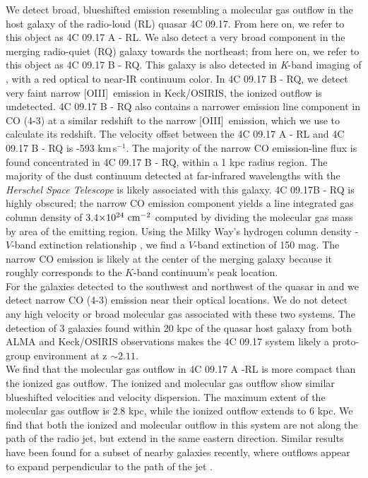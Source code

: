 \documentclass[twocolumn]{aastex63}
\newcommand{\oiii}{[O{\sc III}]\xspace}
\newcommand{\kms}{km\,s$^{-1}$}
\begin{document}
We detect broad, blueshifted emission resembling a molecular gas outflow in the host galaxy of the radio-loud (RL) quasar 4C 09.17. From here on, we refer to this object as 4C 09.17 A - RL. We also detect a very broad component in the merging radio-quiet (RQ) galaxy towards the northeast; from here on, we refer to this object as 4C 09.17 B - RQ. This galaxy is also detected in \textit{K}-band imaging of \citet{Armus97}, with a red optical to near-IR continuum color. In 4C 09.17 B - RQ, we detect very faint narrow \oiii\ emission in Keck/OSIRIS, the ionized outflow is undetected. 4C 09.17 B - RQ also contains a narrower emission line component in CO (4-3) at a similar redshift to the narrow \oiii\ emission, which we use to calculate its redshift. The velocity offset between the 4C 09.17 A - RL and 4C 09.17 B - RQ is -593 \kms. The majority of the narrow CO emission-line flux is found concentrated in 4C 09.17 B - RQ, within a 1 kpc radius region. The majority of the dust continuum detected at far-infrared wavelengths with the \textit{Herschel Space Telescope} is likely associated with this galaxy. 4C 09.17B - RQ is highly obscured; the narrow CO emission component yields a line integrated gas column density of 3.4$\rm \times10^{24}~cm^{-2}$ computed by dividing the molecular gas mass by area of the emitting region. Using the Milky Way's hydrogen column density - $V$-band extinction relationship \citep{Guver09}, we find a $V$-band extinction of 150 mag. The narrow CO emission is likely at the center of the merging galaxy because it roughly corresponds to the $K$-band continuum's peak location.\\

For the galaxies detected to the southwest and northwest of the quasar in \citet{Armus97} and \citet{Lehnert99} we detect narrow CO (4-3) emission near their optical locations. We do not detect any high velocity or broad molecular gas associated with these two systems. The detection of 3 galaxies found within 20 kpc of the quasar host galaxy from both ALMA and Keck/OSIRIS observations makes the 4C 09.17 system likely a proto-group environment at z $\sim 2.11$. \\

We find that the molecular gas outflow in 4C 09.17 A -RL is more compact than the ionized gas outflow. The ionized and molecular gas outflow show similar blueshifted velocities and velocity dispersion. The maximum extent of the molecular gas outflow is 2.8 kpc, while the ionized outflow extends to 6 kpc. We find that both the ionized and molecular outflow in this system are not along the path of the radio jet, but extend in the same eastern direction. Similar results have been found for a subset of nearby galaxies recently, where outflows appear to expand perpendicular to the path of the jet \citep{Venturi21}. \\
\end{document}
